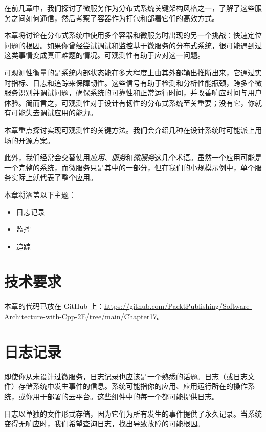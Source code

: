 在前几章中，我们探讨了微服务作为分布式系统关键架构风格之一，了解了这些服务之间如何通信，然后考察了容器作为打包和部署它们的高效方式。

本章将讨论在分布式系统中使用多个容器和微服务时出现的另一个挑战：快速定位问题的根因。如果你曾经尝试调试和监控基于微服务的分布式系统，很可能遇到过这类事情变成真正难题的情况。可观测性有助于应对这一问题。

可观测性衡量的是系统内部状态能在多大程度上由其外部输出推断出来，它通过实时指标、日志和追踪来保障韧性。这些信号有助于检测和分析性能瓶颈，跨多个微服务识别并调试问题，确保系统的可靠性和正常运行时间，并改善响应时间与用户体验。简而言之，可观测性对于设计有韧性的分布式系统至关重要；没有它，你就有可能失去调试应用的能力。

本章重点探讨实现可观测性的关键方法。我们会介绍几种在设计系统时可能派上用场的开源方案。

此外，我们经常会交替使用\emph{应用}、\emph{服务}和\emph{微服务}这几个术语。虽然一个应用可能是一个完整的系统，而微服务只是其中的一部分，但在我们的小规模示例中，单个服务实际上就代表了整个应用。

本章将涵盖以下主题：

\begin{itemize}
\item 日志记录
\item 监控
\item 追踪
\end{itemize}

\section{技术要求}

本章的代码已放在 GitHub 上：\href{https://github.com/PacktPublishing/Software-Architecture-with-Cpp-2E/tree/main/Chapter17}{https://github.com/PacktPublishing/Software-Architecture-with-Cpp-2E/tree/main/Chapter17}。

\section{日志记录}

即使你从未设计过微服务，日志记录也应该是一个熟悉的话题。日志（或日志文件）存储系统中发生事件的信息。系统可能指你的应用、应用运行所在的操作系统，或你用于部署的云平台。这些组件中的每一个都可能提供日志。

\label{idx:1842}
日志以单独的文件形式存储，因为它们为所有发生的事件提供了永久记录。当系统变得无响应时，我们希望查询日志，找出导致故障的可能根因。

